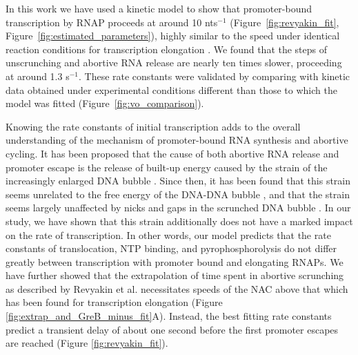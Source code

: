 %
In this work we have used a kinetic model to show that promoter-bound
transcription by RNAP proceeds at around 10 nts$^{-1}$
(Figure~\ref{fig:revyakin_fit}, Figure~\ref{fig:estimated_parameters}), highly
similar to the speed under identical reaction conditions for transcription
elongation \cite{revyakin_abortive_2006}. We found that the steps of
unscrunching and abortive RNA release are nearly ten times slower, proceeding
at around 1.3 s$^{-1}$. These rate constants were validated by comparing with
kinetic data obtained under experimental conditions different than those to
which the model was fitted (Figure~\ref{fig:vo_comparison}).

Knowing the rate constants of initial transcription adds to the overall
understanding of the mechanism of promoter-bound RNA synthesis and abortive
cycling. It has been proposed that the cause of both abortive RNA release and
promoter escape is the release of built-up energy caused by the strain of the
increasingly enlarged DNA bubble
\cite{straney_stressed_1987,hsu_promoter_2002,revyakin_abortive_2006}. Since
then, it has been found that this strain seems unrelated to the free energy of
the DNA-DNA bubble \cite{hsu_initial_2006, skancke_sequence-dependent_2015},
and that the strain seems largely unaffected by nicks and gaps in the
scrunched DNA bubble \cite{samanta_insights_2013}. In our study, we have shown
that this strain additionally does not have a marked impact on the rate of
transcription. In other words, our model predicts that the rate constants of
translocation, NTP binding, and pyrophosphorolysis do not differ greatly
between transcription with promoter bound and elongating RNAPs. We have
further showed that the extrapolation of time spent in abortive scrunching as
described by Revyakin et al. necessitates speeds of the NAC above that which
has been found for transcription elongation (Figure
\ref{fig:extrap_and_GreB_minus_fit}A). Instead, the best fitting rate
constants predict a transient delay of about one second before the first
promoter escapes are reached (Figure \ref{fig:revyakin_fit}).

